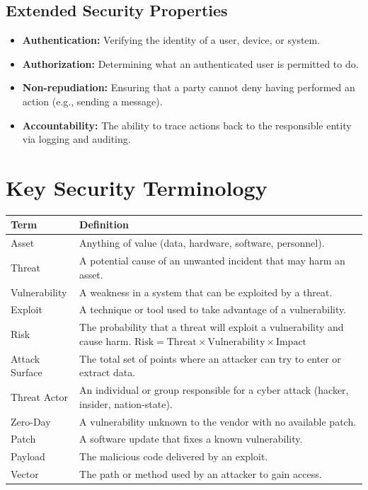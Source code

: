 \documentclass[11pt,a4paper]{article}
\begin{document}
\subsection{Extended Security Properties}
\begin{itemize}[leftmargin=*]
  \item \textbf{Authentication:} Verifying the identity of a user, device, or system.
  \item \textbf{Authorization:} Determining what an authenticated user is permitted to do.
  \item \textbf{Non-repudiation:} Ensuring that a party cannot deny having performed an action (e.g., sending a message).
  \item \textbf{Accountability:} The ability to trace actions back to the responsible entity via logging and auditing.
\end{itemize}

\section{Key Security Terminology}

\begin{longtable}{@{}p{3.5cm}p{10cm}@{}}
\toprule
\rowcolor{primary!15}
\textbf{Term} & \textbf{Definition} \\
\midrule
\endhead
Asset & Anything of value (data, hardware, software, personnel). \\
\addlinespace
Threat & A potential cause of an unwanted incident that may harm an asset. \\
\addlinespace
Vulnerability & A weakness in a system that can be exploited by a threat. \\
\addlinespace
Exploit & A technique or tool used to take advantage of a vulnerability. \\
\addlinespace
Risk & The probability that a threat will exploit a vulnerability and cause harm. $\text{Risk} = \text{Threat} \times \text{Vulnerability} \times \text{Impact}$ \\
\addlinespace
Attack Surface & The total set of points where an attacker can try to enter or extract data. \\
\addlinespace
Threat Actor & An individual or group responsible for a cyber attack (hacker, insider, nation-state). \\
\addlinespace
Zero-Day & A vulnerability unknown to the vendor with no available patch. \\
\addlinespace
Patch & A software update that fixes a known vulnerability. \\
\addlinespace
Payload & The malicious code delivered by an exploit. \\
\addlinespace
Vector & The path or method used by an attacker to gain access. \\
\bottomrule
\end{longtable}
\end{document}
